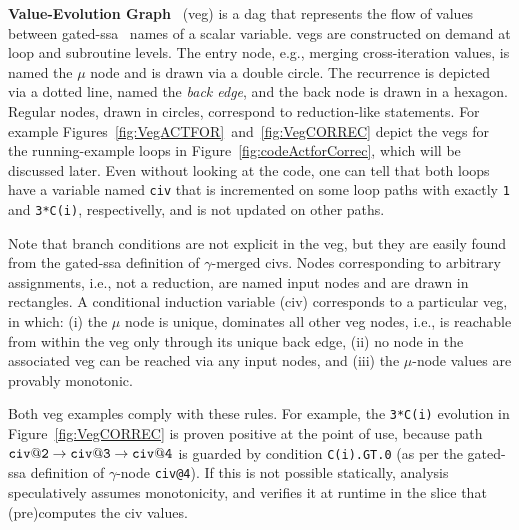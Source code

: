 \documentclass{sig-alternate}
\begin{document}
\vspace{1ex}

{\bf Value-Evolution Graph}~\cite{VEG} ({\sc veg}) is a {\sc dag}  %
that represents the flow of values between gated-{\sc ssa}~\cite{GatedSSA} names 
of a scalar variable.  
%
{\sc veg}s are constructed on demand at loop and subroutine levels.
%
The entry node, e.g., merging cross-iteration values,  is named 
the $\mu$ node and is drawn via a double circle. The recurrence is 
depicted via a dotted line, named the {\em back edge}, and the
back node is drawn in a hexagon.
%
Regular nodes, drawn in circles, correspond to reduction-like statements.
For example Figures~\ref{fig:VegACTFOR}~and~\ref{fig:VegCORREC} 
depict the {\sc veg}s for the running-example loops in 
Figure~\ref{fig:codeActforCorrec}, which will be discussed later. 
Even without looking at the code, one can tell that both loops
have a variable named {\tt civ} that is incremented on some loop
paths with exactly {\tt 1} and {\tt 3*C(i)}, respectivelly, 
and is not updated on other paths. 
%

Note that branch conditions are not explicit in the {\sc veg}, 
but they are easily found from the gated-{\sc ssa} definition 
of $\gamma$-merged {\sc civ}s. %
%
Nodes corresponding to arbitrary assignments, i.e., not a reduction, are
named input nodes and are drawn in rectangles. 
%
A conditional induction variable ({\sc civ}) corresponds to a
particular {\sc veg}, in which:
  (i) the $\mu$ node is unique, dominates all other {\sc veg} nodes,
            i.e., is reachable from within the {\sc veg} only through its
            unique back edge, %
%
 (ii) no node in the associated {\sc veg} can be reached via any input nodes, and 
%
(iii) the $\mu$-node values are provably monotonic.
            
Both {\sc veg} examples comply with these rules.
For example, the {\tt 3*C(i)} evolution in 
Figure~\ref{fig:VegCORREC} is proven positive at the 
point of use, because path 
${\tt civ@2}\rightarrow{\tt civ@3}\rightarrow{\tt civ@4}$
is guarded by condition {\tt C(i).GT.0} (as per the 
gated-{\sc ssa} definition of $\gamma$-node {\tt civ@4}).
If this is not possible statically, analysis speculatively
assumes monotonicity, and verifies it at runtime in the slice 
that (pre)computes the {\sc civ} values. 
\end{document}
